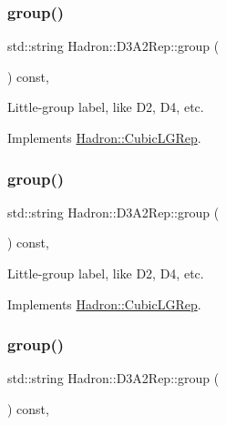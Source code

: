 \subsubsection{\texorpdfstring{group()}{group()}\hspace{0.1cm}{\footnotesize\ttfamily [3/5]}}
{\footnotesize\ttfamily std\+::string Hadron\+::\+D3\+A2\+Rep\+::group (\begin{DoxyParamCaption}{ }\end{DoxyParamCaption}) const\hspace{0.3cm}{\ttfamily [inline]}, {\ttfamily [virtual]}}

Little-\/group label, like D2, D4, etc. 

Implements \mbox{\hyperlink{structHadron_1_1CubicLGRep_a9bdb14b519a611d21379ed96a3a9eb41}{Hadron\+::\+Cubic\+L\+G\+Rep}}.

\mbox{\label{structHadron_1_1D3A2Rep_aca0f5e39c00819bb490bfd5e9cf82c9e}} 
\subsubsection{\texorpdfstring{group()}{group()}\hspace{0.1cm}{\footnotesize\ttfamily [4/5]}}
{\footnotesize\ttfamily std\+::string Hadron\+::\+D3\+A2\+Rep\+::group (\begin{DoxyParamCaption}{ }\end{DoxyParamCaption}) const\hspace{0.3cm}{\ttfamily [inline]}, {\ttfamily [virtual]}}

Little-\/group label, like D2, D4, etc. 

Implements \mbox{\hyperlink{structHadron_1_1CubicLGRep_a9bdb14b519a611d21379ed96a3a9eb41}{Hadron\+::\+Cubic\+L\+G\+Rep}}.

\mbox{\label{structHadron_1_1D3A2Rep_aca0f5e39c00819bb490bfd5e9cf82c9e}} 
\subsubsection{\texorpdfstring{group()}{group()}\hspace{0.1cm}{\footnotesize\ttfamily [5/5]}}
{\footnotesize\ttfamily std\+::string Hadron\+::\+D3\+A2\+Rep\+::group (\begin{DoxyParamCaption}{ }\end{DoxyParamCaption}) const\hspace{0.3cm}{\ttfamily [inline]}, {\ttfamily [virtual]}}

